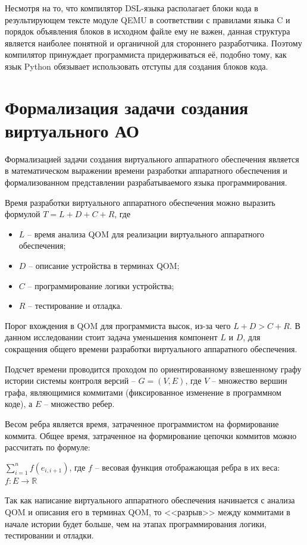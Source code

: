 Несмотря на то, что компилятор DSL-языка располагает
блоки кода в результирующем тексте модуле QEMU в соответствии
с правилами языка C и порядок объявления блоков в исходном файле ему не важен,
данная структура является наиболее понятной и органичной для стороннего разработчика.
Поэтому компилятор принуждает программиста придерживаться её, подобно тому, как
язык Python обязывает использовать отступы для создания блоков кода.

\section{Формализация задачи создания виртуального АО}\label{sec:ch2/sec2/sub1}

Формализацией задачи создания виртуального аппаратного
обеспечения является в математическом выражении времени разработки
аппаратного обеспечения и формализованном представлении разрабатываемого языка программирования.

Время разработки виртуального аппаратного обеспечения
можно выразить формулой $T = L + D + C + R$, где
\begin{itemize}
    \item $L$ -- время анализа QOM для реализации виртуального аппаратного обеспечения;
    \item $D$ -- описание устройства в терминах QOM;
    \item $C$ -- программирование логики устройства;
    \item $R$ -- тестирование и отладка.
\end{itemize}

Порог вхождения в QOM для программиста высок, из-за чего
$L + D > C + R$.
В данном исследовании стоит задача уменьшения компонент $L$ и $D$,
для сокращения общего времени разработки виртуального аппаратного
обеспечения.

Подсчет времени проводится проходом по
ориентированному взвешенному графу истории системы контроля
версий -- $G = (V,E)$, где $V$ -- множество вершин графа,
являющимися коммитами (фиксированное изменение в программном коде),
а $E$ -- множество ребер.

Весом ребра является время, затраченное программистом на
формирование коммита. Общее время, затраченное на
формирование цепочки коммитов можно рассчитать по
формуле:

$\sum_{i=1}^{n} f(e_{i,i+1})$, где $f$ -- весовая функция
отображающая ребра в их веса: $f : E \rightarrow \mathbb{R}$

Так как написание виртуального аппаратного обеспечения
начинается с анализа QOM и описания его в терминах QOM,
то <<разрыв>> между коммитами в начале истории будет больше, чем
на этапах программирования логики, тестировании и отладки.

